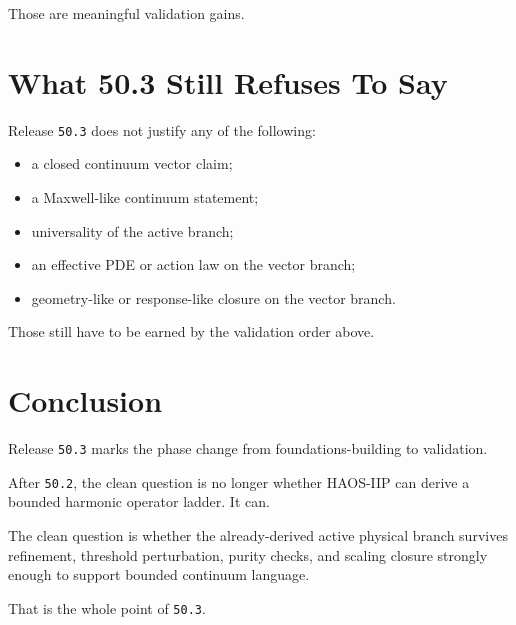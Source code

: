 \documentclass[11pt]{article}
\begin{document}
Those are meaningful validation gains.

\section{What 50.3 Still Refuses To Say}

Release \texttt{50.3} does not justify any of the following:
\begin{itemize}
\item a closed continuum vector claim;
\item a Maxwell-like continuum statement;
\item universality of the active branch;
\item an effective PDE or action law on the vector branch;
\item geometry-like or response-like closure on the vector branch.
\end{itemize}

Those still have to be earned by the validation order above.

\section{Conclusion}

Release \texttt{50.3} marks the phase change from foundations-building to validation.

After \texttt{50.2}, the clean question is no longer whether HAOS-IIP can derive a bounded harmonic operator ladder. It can.

The clean question is whether the already-derived active physical branch survives refinement, threshold perturbation, purity checks, and scaling closure strongly enough to support bounded continuum language.

That is the whole point of \texttt{50.3}.
\end{document}
